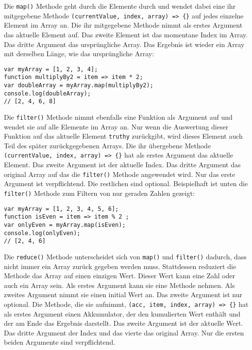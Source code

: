 \documentclass[babel]{book}
\begin{document}
Die \lstinline|map()| Methode geht durch die Elemente durch und wendet dabei eine ihr mitgegebene Methode \lstinline|(currentValue, index, array) => {}| auf jedes einzelne Element im Array an. Die ihr mitgegebene Methode nimmt als erstes Argument das aktuelle Element auf. Das zweite Element ist das momentane Index im Array. Das dritte Argument das ursprüngliche Array. Das Ergebnis ist wieder ein Array mit derselben Länge, wie das ursprüngliche Array:

\begin{lstlisting}[caption=Array Konstruktor]
var myArray = [1, 2, 3, 4];
function multiplyBy2 = item => item * 2;
var doubleArray = myArray.map(multiplyBy2);
console.log(doubleArray);
// [2, 4, 6, 8]
\end{lstlisting}

Die \lstinline|filter()| Methode nimmt ebenfalls eine Funktion als Argument auf und wendet sie auf alle Elemente im Array an. Nur wenn die Auswertung dieser Funktion auf das aktuelle Element \lstinline|truthy| zurückgibt, wird dieses Element auch Teil des später zurückgegebenen Arrays. Die ihr übergebene Methode \lstinline|(currentValue, index, array) => {}| hat als erstes Argument das aktuelle Element. Das zweite Argument ist der aktuelle Index. Das dritte Argument das original Array auf das die \lstinline|filter()| Methode angewendet wird. Nur das erste Argument ist verpflichtend. Die restlichen sind optional. Beispielhaft ist unten die \lstinline|filter()| Methode zum Filtern von nur geraden Zahlen gezeigt:

\begin{lstlisting}[caption=Array Konstruktor]
var myArray = [1, 2, 3, 4, 5, 6];
function isEven = item => item % 2 ;
var onlyEven = myArray.map(isEven);
console.log(onlyEven);
// [2, 4, 6]
\end{lstlisting}

Die \lstinline|reduce()| Methode unterscheidet sich von \lstinline|map()| und \lstinline|filter()| dadurch, dass nicht immer ein Array zurück gegeben werden muss. Stattdessen reduziert die Methode das Array auf einen einzigen Wert. Dieser Wert kann eine Zahl oder auch ein Array sein. Als erstes Argument kann sie eine Methode nehmen. Als zweites Argument nimmt sie einen initial Wert an. Das zweite Argument ist nur optional. Die Methode, die sie aufnimmt, \lstinline|(acc, item, index, array) => {}| hat als erstes Argument einen Akkumulator, der den kumulierten Wert enthält und der am Ende das Ergebnis darstellt. Das zweite Argument ist der aktuelle Wert. Das dritte Argument der Index und das vierte das original Array. Nur die ersten beiden Argumente sind verpflichtend.
\end{document}
